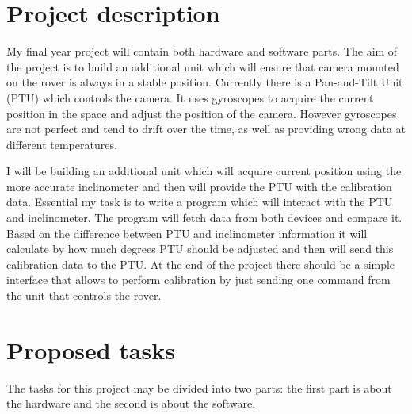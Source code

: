 \documentclass[11pt,fleqn,twoside]{article}
\begin{document}
\wordcount{}

\mmp

\setcounter{tocdepth}{3} %


\section{Project description}
My final year project will contain both hardware and software parts. The aim of the project is to build an additional unit which will ensure that camera mounted on the rover is always in a stable position. Currently there is a Pan-and-Tilt Unit (PTU) which controls the camera. It uses gyroscopes to acquire the current position in the space and adjust the position of the camera. However gyroscopes are not perfect and tend to drift over the time, as well as providing wrong data at different temperatures.

I will be building an additional unit which will acquire current position using the more accurate inclinometer and then will provide the PTU with the calibration data. Essential my task is to write a program which will interact with the PTU and inclinometer. The program will fetch data from both devices and compare it. Based on the difference between PTU and inclinometer information it will calculate by how much degrees PTU should be adjusted and then will send this calibration data to the PTU. At the end of the project there should be a simple interface that allows to perform calibration by just sending one command from the unit that controls the rover.
\section{Proposed tasks}
The tasks for this project may be divided into two parts: the first part is about the hardware and the second is about the software. 
\end{document}
